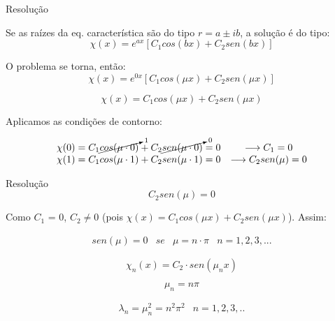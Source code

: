\documentclass{beamer}
\begin{document}
\begin{frame}{Resolução}

Se as raízes da eq. característica são do tipo $r = a \pm ib$, a solução é do tipo:
\begin{equation}
    \chi(x) = e^{ax}\left [C_1 cos (bx) + C_2 sen (bx)\right ]
\end{equation}

O problema se torna, então:
\begin{equation*}
    \chi(x) = e^{0x} \left [ C_1 cos (\mu x) + C_2 sen (\mu x) \right ]
\end{equation*}

\begin{equation}
    \chi(x) = C_1 cos (\mu x) + C_2 sen (\mu x)
\end{equation}

Aplicamos as condições de contorno:

\begin{equation*}
\begin{matrix}
    \chi(0) = C_1 \cancelto{1}{cos (\mu \cdot 0)} + C_2 \cancelto{0}{sen (\mu \cdot 0)} = 0 & \longrightarrow  C_1 = 0\\ 
    \chi(1) = C_1 cos (\mu \cdot 1) + C_2 sen (\mu \cdot 1) = 0 & \longrightarrow C_2 sen(\mu) = 0
\end{matrix}
\end{equation*}

\end{frame}


\begin{frame}{Resolução}
\begin{equation*}
    C_2 sen(\mu) = 0
\end{equation*}

Como $C_1$ = 0, $C_2 \neq 0$ (pois $\chi(x) = C_1 cos (\mu x) + C_2 sen (\mu x)$). Assim:

\begin{equation*}
    \begin{matrix}
        sen(\mu) = 0  & se & \mu = n \cdot \pi & n = 1,2,3,...
    \end{matrix}
\end{equation*}

\begin{block}{ }
\begin{equation}
\label{eq:solucao_chi}
    \chi_n(x) = C_2 \cdot sen (\mu_n x)
\end{equation}
\end{block}

\begin{equation}
        \mu_n = n \pi
\end{equation}

\begin{block}{ }
\begin{equation}
\begin{matrix}
    \lambda_n = \mu_n^2 = n^2\pi^2 & n = 1,2,3,..
 \end{matrix}
\end{equation}
\end{block}


\end{frame}
\end{document}
